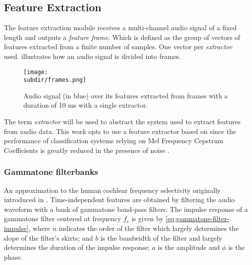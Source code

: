 \subsection{Feature Extraction} \label{subsec:feature-extraction}

The feature extraction module receives a multi-channel audio signal of a fixed
length and outputs a \emph{feature frame}. Which is defined as the group of
vectors of features extracted from a finite number of samples. One vector per
\emph{extractor} used.  illustrates how an audio
signal is divided into frames.

\begin{figure}
    \centering
    \texttt{[image: \\subdir/frames.png]}
    \caption[Audio frames]{Audio signal (in {\color{blue} blue}) over its
        features extracted from frames with a duration of 10 ms with a single
         extractor.}
    \label{fig:datasets-frames}
\end{figure}

The term \emph{extractor} will be used to abstract the system used to extract
features from audio data. This work opts to use a feature extractor based on
 since the performance of
classification systems relying on Mel Frequency Cepstrum Coefficients is
greatly reduced in the presence of noise \cite{marchegiani2018a}.

\subsubsection*{Gammatone filterbanks} \label{subsubsec:gammatone-filterbank}

An approximation to the human cochlear frequency selectivity originally
introduced in \cite{GTF1998}. Time-independent features are obtained by
filtering the audio waveform with a bank of gammatone band-pass filters. The
impulse response of a gammatone filter centered at frequency $f_c$ is given by
\cref{eq:gammatone-filter-impulse}, where $n$ indicates the order of the filter
which largely determines the slope of the filter's skirts; and $b$ is the
bandwidth of the filter and largely determines the duration of the impulse
response; $a$ is the amplitude and $\phi$ is the phase.


